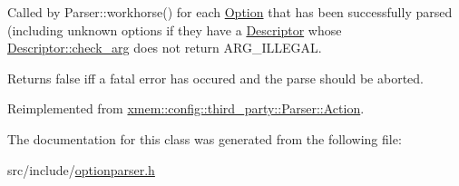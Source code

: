 Called by Parser\+::workhorse() for each \hyperlink{classxmem_1_1config_1_1third__party_1_1_option}{Option} that has been successfully parsed (including unknown options if they have a \hyperlink{structxmem_1_1config_1_1third__party_1_1_descriptor}{Descriptor} whose \hyperlink{structxmem_1_1config_1_1third__party_1_1_descriptor_a65b39f8d61de820bb5001d590e7dea5d}{Descriptor\+::check\+\_\+arg} does not return A\+R\+G\+\_\+\+I\+L\+L\+E\+G\+A\+L. 

Returns {\ttfamily false} iff a fatal error has occured and the parse should be aborted. 

Reimplemented from \hyperlink{structxmem_1_1config_1_1third__party_1_1_parser_1_1_action_aeffc43365955b3dc5f54552093518aa5}{xmem\+::config\+::third\+\_\+party\+::\+Parser\+::\+Action}.



The documentation for this class was generated from the following file\+:\begin{DoxyCompactItemize}
\item 
src/include/\hyperlink{optionparser_8h}{optionparser.\+h}\end{DoxyCompactItemize}
